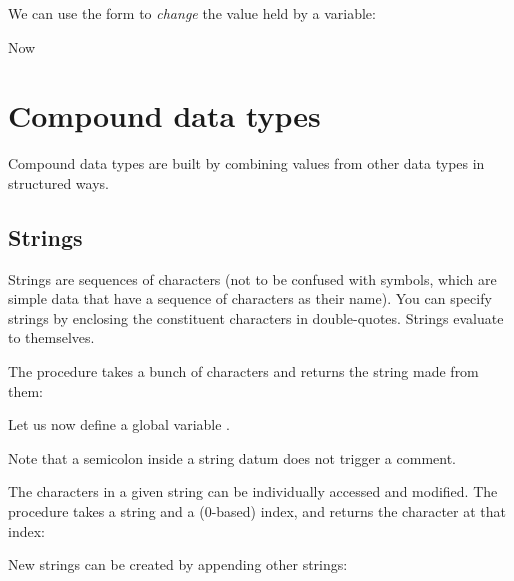 {

\n We can use the form  to {\em change} the value held by a
variable:


\n Now



\section{Compound data types}

Compound data types are built by combining values from
other data types in structured ways.


\subsection{Strings}

Strings are sequences of characters (not to be confused with
symbols, which are simple data that have a sequence of
characters as their name).  You can specify strings by
enclosing the constituent characters in double-quotes.
Strings evaluate to themselves.



\n The procedure  takes a bunch of characters and
returns the string made from them:


\n Let us now define a global variable .  


\n Note that a semicolon inside a string datum does not
trigger a comment.


The characters in a given string can be individually
accessed and modified.  The procedure  takes a
string and a (0-based) index, and returns the character at
that index:




\n New strings can be created by appending other strings:

}
